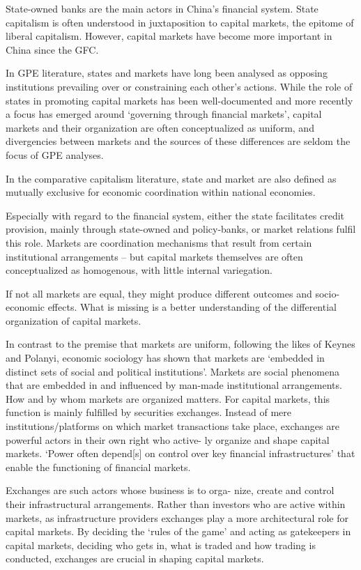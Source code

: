 \documentclass[
]{book}
\begin{document}
State-owned banks are the main actors in China's financial system.
State capitalism is often understood in juxtaposition to capital markets, the epitome of
liberal capitalism. However, capital markets have become more important in China since
the GFC.

In GPE literature,
states and markets have long been analysed as opposing institutions prevailing over or
constraining each other's actions.
While the role of states
in promoting capital markets has been well-documented and more recently
a focus has emerged around `governing through financial markets',
capital markets and their organization are often conceptualized as uniform, and divergencies
between markets and the sources of these differences are seldom the focus of GPE analyses.

In the comparative capitalism literature, state and market are also defined as
mutually exclusive for economic coordination within national economies.

Especially with regard to the financial system,
either the state facilitates credit provision, mainly through state-owned and policy-banks,
or market relations fulfil this role. Markets are coordination mechanisms
that result from certain institutional arrangements -- but capital markets themselves are
often conceptualized as homogenous, with little internal variegation.

If not all markets are equal,
they might produce different outcomes and socio-economic effects. What is missing is a
better understanding of the differential organization of capital markets.

In contrast to the premise that markets are uniform, following the likes of Keynes and
Polanyi, economic sociology has shown that markets are `embedded in distinct sets of social
and political institutions'.
Markets are social phenomena that are
embedded in and influenced by man-made institutional arrangements.
How and by whom markets are organized matters. For capital markets, this function is
mainly fulfilled by securities exchanges.
Instead of mere institutions/platforms on which
market transactions take place, exchanges are powerful actors in their own right who active-
ly organize and shape capital markets.
`Power often depend{[}s{]} on control over key financial infrastructures' that enable
the functioning of financial markets.

Exchanges are such actors whose business is to orga-
nize, create and control their infrastructural arrangements. Rather than investors who are
active within markets, as infrastructure providers exchanges play a more architectural role
for capital markets. By deciding the `rules of the game' and acting as gatekeepers in capital
markets, deciding who gets in, what is traded and how trading is conducted, exchanges are
crucial in shaping capital markets.
\end{document}

